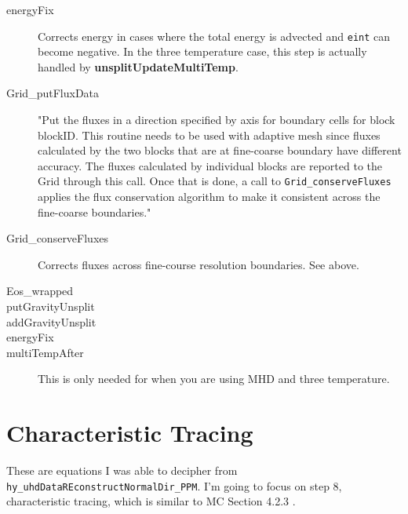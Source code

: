 \documentclass[preprint,11pt]{aastex}
\begin{document}
\begin{description}
\begin{description}
		\item[energyFix] Corrects energy in cases where the total energy is advected and \verb!eint! can become negative.  In the three temperature case, this step is actually handled by \textbf{unsplitUpdateMultiTemp}.
		\item[Grid\_putFluxData] "Put the fluxes in a direction specified by axis for boundary cells for block blockID. This routine needs to be used with adaptive mesh since fluxes calculated by the two blocks that are at fine-coarse boundary have different accuracy. The fluxes calculated by individual blocks are reported to  the Grid through this call. Once that is done, a call to \verb!Grid_conserveFluxes! applies the flux conservation algorithm to make it consistent across the fine-coarse boundaries."
		\item[Grid\_conserveFluxes] Corrects fluxes across fine-course resolution boundaries.  See above.
		\item[Eos\_wrapped]
		\item[putGravityUnsplit]
		\item[addGravityUnsplit]
		\item[energyFix]
		\item[multiTempAfter] This is only needed for when you are using MHD and three temperature.

	
	\end{description}
	\end{description}

\section{Characteristic Tracing}
\label{sec:characteristic}
These are equations I was able to decipher from \verb!hy_uhdDataREconstructNormalDir_PPM!.  I'm going to focus on step $8$, characteristic tracing, which is similar to MC Section 4.2.3 .
\end{document}
